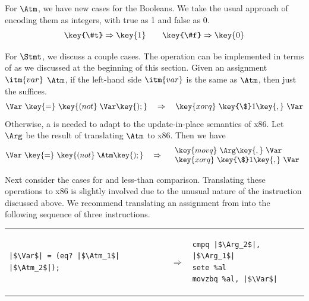\documentclass[11pt]{book}
\begin{document}
{For $\Atm$, we have new cases for the Booleans.  We take the usual
approach of encoding them as integers, with true as 1 and false as 0.
\[
\key{\#t} \Rightarrow \key{1}
\qquad
\key{\#f} \Rightarrow \key{0}
\]

For $\Stmt$, we discuss a couple cases.  The  operation can
be implemented in terms of  as we discussed at the
beginning of this section. Given an assignment
$\itm{var}$ \key{=}  $\Atm$\key{);},
if the left-hand side $\itm{var}$ is
the same as $\Atm$, then just the  suffices.
\[
\Var~\key{=}~ \key{(not}\; \Var\key{);}
\quad\Rightarrow\quad
\key{xorq}~\key{\$}1\key{,}~\Var
\]
Otherwise, a  is needed to adapt to the update-in-place
semantics of x86. Let $\Arg$ be the result of translating $\Atm$ to
x86. Then we have
\[
\Var~\key{=}~ \key{(not}\; \Atm\key{);}
\quad\Rightarrow\quad
\begin{array}{l}
\key{movq}~\Arg\key{,}~\Var\\
\key{xorq}~\key{\$}1\key{,}~\Var
\end{array}
\]

Next consider the cases for  and less-than comparison.
Translating these operations to x86 is slightly involved due to the
unusual nature of the  instruction discussed above.  We
recommend translating an assignment from  into the following
sequence of three instructions. \\
\begin{tabular}{lll}
\begin{minipage}{0.4\textwidth}
\begin{lstlisting}
|$\Var$| = (eq? |$\Atm_1$| |$\Atm_2$|);
\end{lstlisting}
\end{minipage}
&
$\Rightarrow$
&
\begin{minipage}{0.4\textwidth}
\begin{lstlisting}
cmpq |$\Arg_2$|, |$\Arg_1$|
sete %al
movzbq %al, |$\Var$|
\end{lstlisting}
\end{minipage}
\end{tabular}  \\

}
\end{document}
